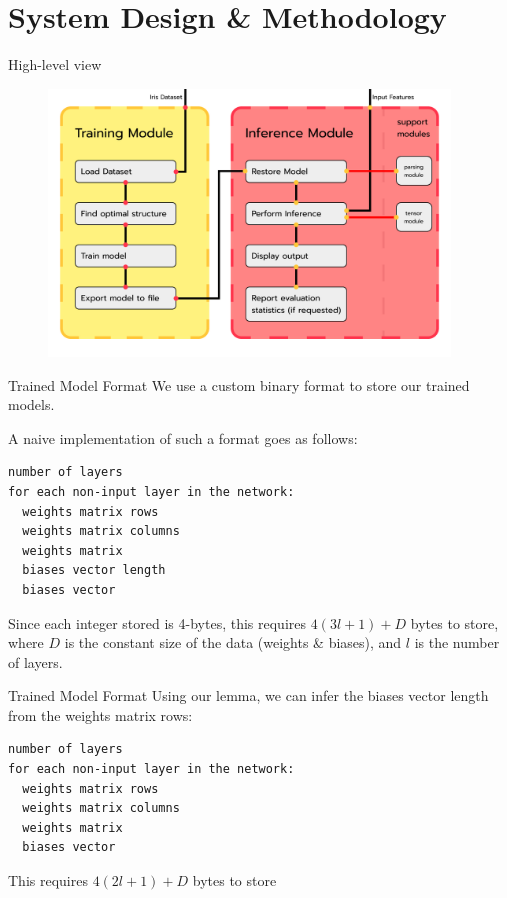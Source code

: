 \documentclass{beamer}
\begin{document}
\section{System Design \& Methodology}
\begin{frame}{High-level view}
  \begin{figure}
    \includegraphics[width=0.95\textwidth]{../images/modules.png}
  \end{figure}
\end{frame}

\begin{frame}[fragile]{Trained Model Format}
  We use a custom binary format to store our trained models.
  
  A naive implementation of such a format goes as follows:
  \begin{verbatim}
number of layers
for each non-input layer in the network:
  weights matrix rows
  weights matrix columns
  weights matrix
  biases vector length
  biases vector
  \end{verbatim}
  Since each integer stored is 4-bytes, this requires $4(3l + 1) + D$ bytes to store, where $D$ is the constant size of the data (weights \& biases), and $l$ is the number of layers.
\end{frame}

\begin{frame}[fragile]{Trained Model Format}
  Using our lemma, we can infer the biases vector length from the weights matrix rows:
  \begin{verbatim}
number of layers
for each non-input layer in the network:
  weights matrix rows
  weights matrix columns
  weights matrix
  biases vector
  \end{verbatim}
  This requires $4(2l + 1) + D$ bytes to store
\end{frame}
\end{document}

